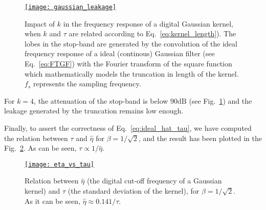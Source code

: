 \begin{subappendices}
\begin{figure}
  \centering
  \href{https://nbviewer.org/github/vicente-gonzalez-ruiz/denoising/blob/main/notebooks/gaussian_leakage.ipynb\#Gaussian_leakage}{\texttt{[image: gaussian\_leakage]}}
  \caption{Impact of $k$ in the frequency response of a digital
    Gaussian kernel, when $k$ and $\tau$ are related according
    to Eq.~\ref{eq:kernel_length}). The lobes in the stop-band are
    generated by the convolution of the ideal frequency response of a
    ideal (continous) Gaussian filter (see Eq.~\ref{eq:FTGF}) with the
    Fourier transform of the square function which mathematically
    models the truncation in length of the kernel. $f_s$ represents
    the sampling frequency.\label{fig:gaussian_leakage}}
\end{figure}

For $k=4$, the attenuation of the stop-band is below $90\text{dB}$
(see Fig.~\ref{fig:gaussian_leakage}) and the leakage generated by the
truncation remains low enough.

Finally, to assert the correctness of Eq.~\ref{eq:ideal_hat_tau}, we
have computed the relation between $\tau$ and $\hat{\eta}$ for
$\beta=1/\sqrt{2}$, and the result has been plotted in the
Fig.~\ref{fig:eta_vs_tau}. As can be seen, $\tau\propto 1/\hat{\eta}$.

\begin{figure}
  \centering
  \href{https://nbviewer.org/github/vicente-gonzalez-ruiz/denoising/blob/main/notebooks/eta_vs_tau.ipynb\#Eta_vs_tau}{\texttt{[image: eta\_vs\_tau]}}
  \caption{Relation between $\hat\eta$ (the digital cut-off frequency
    of a Gaussian kernel) and $\tau$ (the standard deviation of
    the kernel), for $\beta=1/\sqrt{2}$. As it can be seen, $\hat\eta\approx 0.141/\tau$. \label{fig:eta_vs_tau}}
\end{figure}

\begin{comment}
To convert to normalized frequency, we must divide by $f_s$, the
sampling frequency. For example, if $f_s=1$, we are supposing one
sample per unit distance.
\end{comment}

\begin{comment}
Now, if we are using digital signals, where the frequency is
normalized relative to Nyquist frequency, we have that


\end{comment}
\end{subappendices}
